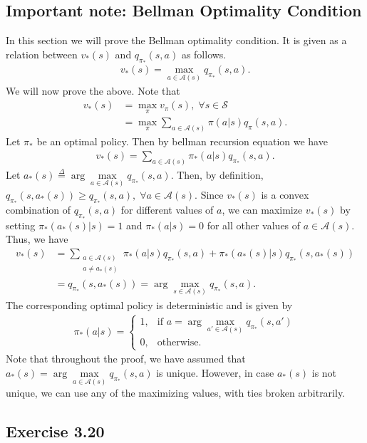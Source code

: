 \documentclass[10pt]{article}
\newcommand{\ldef}{\stackrel{\Delta}{=}}
\begin{document}
	\subsection*{Important note: Bellman Optimality Condition}
	\label{ss:bell-op-con}
	In this section we will prove the Bellman optimality condition. It is given as a relation between $v_*(s)$ and $q_{\pi_*}(s,a)$ as follows.
	\begin{align*}
	v_*(s) = \max\limits_{a\in\mathcal{A}(s)} q_{\pi_*}(s,a).
	\end{align*}
	We will now prove the above. Note that
	\begin{align*}
	v_*(s) &= \max\limits_\pi v_\pi (s), \;\forall s \in \mathcal{S}\\
	&= \max\limits_\pi \sum_{a\in\mathcal{A}(s)} \pi(a|s) q_\pi(s,a).
	\end{align*}
	Let $\pi_*$ be an optimal policy. Then by bellman recursion equation we have
	\begin{align*}
	v_*(s) = \sum_{a\in\mathcal{A}(s)} \pi_*(a|s)q_{\pi_*}(s,a).
	\end{align*}
	Let $a_*(s) \ldef \arg\max\limits_{a\in\mathcal{A}(s)} q_{\pi_*}(s,a)$. Then, by definition, $q_{\pi_*}(s,a_*(s)) \geq q_{\pi_*}(s,a), \; \forall a\in\mathcal{A}(s)$. Since $v_*(s)$ is a convex combination of $q_{\pi_*}(s,a)$ for different values of $a$, we can maximize $v_*(s)$ by setting $\pi_*(a_*(s)|s)=1$ and $\pi_*(a|s) =0$ for all other values of $a\in\mathcal{A}(s)$. Thus, we have
	\begin{align*}
	v_*(s) &= \sum_{\substack{a\in\mathcal{A}(s)\\ a\neq a_*(s)}} \pi_*(a|s)q_{\pi_*}(s,a) + \pi_*(a_*(s)|s) q_{\pi_*}(s,a_*(s))\\
	&=q_{\pi_*}(s,a_*(s)) = \arg\max\limits_{s\in\mathcal{A}(s)} q_{\pi_*}(s,a).
	\end{align*} 
	The corresponding optimal policy is deterministic and is given by
	\begin{align*}
	\pi_*(a|s) = 
	\begin{cases}
	1,& \text{if } a = \displaystyle\arg\max_{a'\in\mathcal{A}(s)} q_{\pi_*}(s,a')\\
	0,& \text{otherwise.}
	\end{cases}
	\end{align*}
	Note that throughout the proof, we have assumed that $a_*(s) = \arg\max\limits_{a\in\mathcal{A}(s)}q_{\pi_*}(s,a)$ is unique. However, in case $a_*(s)$ is not unique, we can use any of the maximizing values, with ties broken arbitrarily.
	\subsection*{Exercise 3.20}
	\label{ss:3.20}
\end{document}

